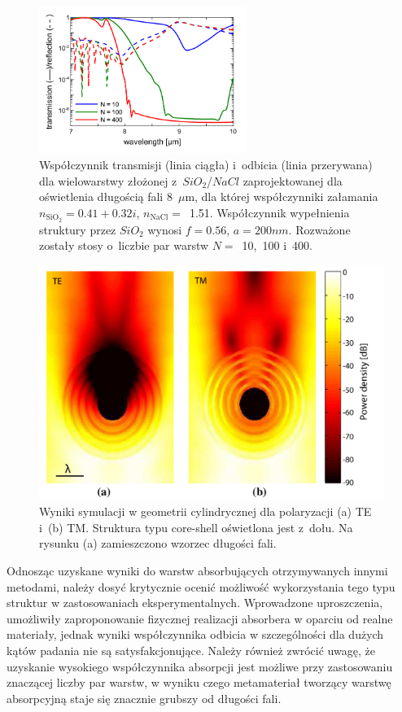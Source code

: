 \begin{figure}[tb]
	\centering
	\includegraphics[width=0.6\textwidth]{images/pml/oqe_trans_refl.png}
	\caption{Współczynnik transmisji (linia ciągła) i~odbicia (linia przerywana) dla wielowarstwy złożonej z~$SiO_2$/$NaCl$ zaprojektowanej dla oświetlenia długością fali 8~$\mu$m, dla której współczynniki załamania $n_{\textrm{SiO}_2}=0.41+0.32i$, $n_{\textrm{NaCl}}=$~1.51. Współczynnik wypełnienia struktury przez $SiO_2$ wynosi $f=0.56$, $a=200nm$. Rozważone zostały stosy o~liczbie par warstw $N=$~10,~100 i~400.}
	\label{fig:oqe-trans-refl}
\end{figure}

\begin{figure}[tb]
	\includegraphics[width=\textwidth]{images/pml/oqe_coreshell.png}
	\caption{Wyniki symulacji w geometrii cylindrycznej dla polaryzacji (a) TE i~(b) TM. Struktura typu core-shell oświetlona jest z~dołu. Na rysunku (a) zamieszczono wzorzec długości fali.}
	\label{fig:oqecoreshell}
\end{figure}


Odnosząc uzyskane wyniki do warstw absorbujących otrzymywanych innymi metodami, należy dosyć krytycznie ocenić możliwość wykorzystania tego typu struktur w zastosowaniach eksperymentalnych. Wprowadzone uproszczenia, umożliwiły zaproponowanie fizycznej realizacji absorbera w oparciu od realne materiały, jednak wyniki współczynnika odbicia w szczególności dla dużych kątów padania nie są satysfakcjonujące. Należy również zwrócić uwagę, że uzyskanie wysokiego współczynnika absorpcji jest możliwe przy zastosowaniu znaczącej liczby par warstw, w wyniku czego metamateriał tworzący warstwę absorpcyjną staje się znacznie grubszy od długości fali. 

